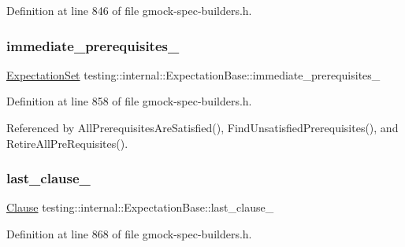 Definition at line 846 of file gmock-\/spec-\/builders.\+h.

\mbox{\label{classtesting_1_1internal_1_1ExpectationBase_a186eff0fdcacc8c1e1a2becdec11d3cd}} 
\subsubsection{\texorpdfstring{immediate\+\_\+prerequisites\+\_\+}{immediate\_prerequisites\_}}
{\footnotesize\ttfamily \hyperlink{classtesting_1_1ExpectationSet}{Expectation\+Set} testing\+::internal\+::\+Expectation\+Base\+::immediate\+\_\+prerequisites\+\_\+\hspace{0.3cm}{\ttfamily [protected]}}



Definition at line 858 of file gmock-\/spec-\/builders.\+h.



Referenced by All\+Prerequisites\+Are\+Satisfied(), Find\+Unsatisfied\+Prerequisites(), and Retire\+All\+Pre\+Requisites().

\mbox{\label{classtesting_1_1internal_1_1ExpectationBase_a584f296e53b4cc002ddf5e65e44d72d9}} 
\subsubsection{\texorpdfstring{last\+\_\+clause\+\_\+}{last\_clause\_}}
{\footnotesize\ttfamily \hyperlink{classtesting_1_1internal_1_1ExpectationBase_a450f34b979ec5814c91d4eab6b78cfc2}{Clause} testing\+::internal\+::\+Expectation\+Base\+::last\+\_\+clause\+\_\+\hspace{0.3cm}{\ttfamily [protected]}}



Definition at line 868 of file gmock-\/spec-\/builders.\+h.



